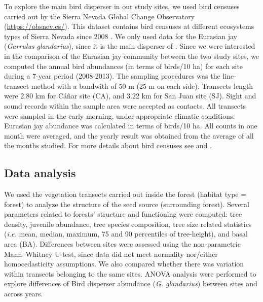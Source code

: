 To explore the main bird disperser in our study sites, we used bird censuses carried out by the Sierra Nevada Global Change Observatory (\href{https://obsnev.es/}{https://obsnev.es/}). This dataset contains bird censuses at different ecosystems types of Sierra Nevada since 2008 \autocites[for more details see][]{BareaAzconetal2012PasseriformesOtrasa, PerezLuqueetal2016DatasetPasserine}. We only used data for the Eurasian jay (\emph{Garrulus glandarius}), since it is the main disperser of \Qpy \autocites{Gomez2003ImpactVertebrate}. Since we were interested in the comparison of the Eurasian jay community between the two study sites, we computed the annual bird abundances (in terms of birds/10 ha) for each site during a 7-year period (2008-2013). The sampling procedures was the line-transect method with a bandwith of 50 m (25 m on each side). Transects length were 2.80 km for Cáñar site (CA), and 3.22 km for San Juan site (SJ). Sight and sound records within the sample area were accepted as contacts. All transects were sampled in the early morning, under appropriate climatic conditions. Eurasian jay abundance was calculated in terms of birds/10 ha. All counts in one month were averaged, and the yearly result was obtained from the average of all the months studied. For more details about bird censuses see \citet{BareaAzconetal2012PasseriformesOtrasa} and \citet{ZamoraBareaAzcon2015LongTermChanges}.

\subsection{Data analysis}\label{sec:coloniza:analysis}
We used the vegetation transects carried out inside the forest (habitat type = forest) to analyze the structure of the seed source (surrounding forest). Several parameters related to forests' structure and functioning were computed: tree density, juvenile abundance, tree species composition, tree size related statistics (\emph{i.e.} mean, median, maximum, 75 and 90 percentiles of tree-height), and basal area (BA). Differences between sites were assessed using the non-parametric Mann–Whitney U-test, since data did not meet normality nor/either homocedasticity assumptions. We also compared whether there was variation within transects belonging to the same sites. ANOVA analysis were performed to explore differences of Bird disperser abundance (\emph{G. glandarius}) between sites and across years. 

